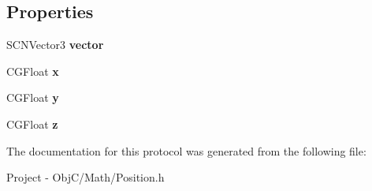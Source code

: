\subsection*{Properties}
\begin{DoxyCompactItemize}
\item 
\hypertarget{protocol_position_export-p_a26e8f8f6853d34d60ab33ab40a2ca69e}{}S\+C\+N\+Vector3 {\bfseries vector}\label{protocol_position_export-p_a26e8f8f6853d34d60ab33ab40a2ca69e}

\item 
\hypertarget{protocol_position_export-p_a12f19e9aa141c6cfb0d1e2b2bab11204}{}C\+G\+Float {\bfseries x}\label{protocol_position_export-p_a12f19e9aa141c6cfb0d1e2b2bab11204}

\item 
\hypertarget{protocol_position_export-p_a763929e41e34b5513d99dfd87b09a17d}{}C\+G\+Float {\bfseries y}\label{protocol_position_export-p_a763929e41e34b5513d99dfd87b09a17d}

\item 
\hypertarget{protocol_position_export-p_acafb02d1ccc1d3ed21440295b8a1f3e3}{}C\+G\+Float {\bfseries z}\label{protocol_position_export-p_acafb02d1ccc1d3ed21440295b8a1f3e3}

\end{DoxyCompactItemize}


The documentation for this protocol was generated from the following file\+:\begin{DoxyCompactItemize}
\item 
Project -\/ Obj\+C/\+Math/Position.\+h\end{DoxyCompactItemize}
